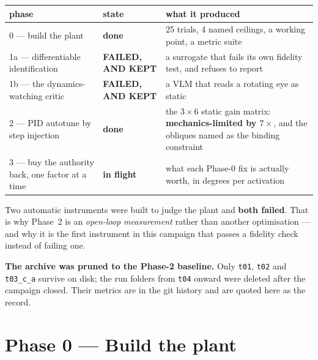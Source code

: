 \documentclass[11pt,a4paper]{article}
\newcommand{\code}[1]{\texttt{#1}}
\newcommand{\dn}{\textcolor{good}{\textbf{done}}}
\newcommand{\fl}{\textcolor{warn}{\textbf{in flight}}}
\newcommand{\wrong}{\textcolor{bad}{\textbf{FAILED, AND KEPT}}}
\begin{document}
\begin{center}\small
\begin{tabular}{@{}llp{7.6cm}@{}}
\toprule
\textbf{phase} & \textbf{state} & \textbf{what it produced} \\
\midrule
0 --- build the plant & \dn & 25 trials, 4 named ceilings, a working point, a metric suite \\
1a --- differentiable identification & \wrong & a surrogate that fails its own fidelity test, and refuses to report \\
1b --- the dynamics-watching critic & \wrong & a VLM that reads a rotating eye as static \\
2 --- PID autotune by step injection & \dn & the $3\times6$ static gain matrix: \textbf{mechanics-limited by $7\times$}, and the obliques named as the binding constraint \\
3 --- buy the authority back, one factor at a time & \fl & what each Phase-0 fix is actually worth, in degrees per activation \\
\bottomrule
\end{tabular}
\end{center}

Two automatic instruments were built to judge the plant and \textbf{both failed}. That is why
Phase~2 is an \emph{open-loop measurement} rather than another optimisation --- and why it is the
first instrument in this campaign that passes a fidelity check instead of failing one.

\begin{tcolorbox}[colback=warn!6,colframe=warn!50,boxrule=0.7pt,arc=2pt]
\textbf{The archive was pruned to the Phase-2 baseline.} Only \code{t01}, \code{t02} and
\code{t03\_c\_a} survive on disk; the run folders from \code{t04} onward were deleted after the
campaign closed. Their metrics are in the git history and are quoted here as the record.
\end{tcolorbox}

\section{Phase 0 --- Build the plant}
\end{document}

